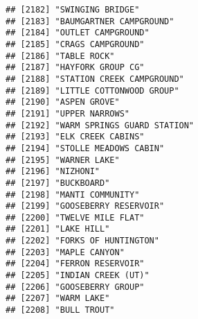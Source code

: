 \documentclass[
]{article}
\begin{document}
\begin{verbatim}
## [2182] "SWINGING BRIDGE"                                                                     
## [2183] "BAUMGARTNER CAMPGROUND"                                                              
## [2184] "OUTLET CAMPGROUND"                                                                   
## [2185] "CRAGS CAMPGROUND"                                                                    
## [2186] "TABLE ROCK"                                                                          
## [2187] "HAYFORK GROUP CG"                                                                    
## [2188] "STATION CREEK CAMPGROUND"                                                            
## [2189] "LITTLE COTTONWOOD GROUP"                                                             
## [2190] "ASPEN GROVE"                                                                         
## [2191] "UPPER NARROWS"                                                                       
## [2192] "WARM SPRINGS GUARD STATION"                                                          
## [2193] "ELK CREEK CABINS"                                                                    
## [2194] "STOLLE MEADOWS CABIN"                                                                
## [2195] "WARNER LAKE"                                                                         
## [2196] "NIZHONI"                                                                             
## [2197] "BUCKBOARD"                                                                           
## [2198] "MANTI COMMUNITY"                                                                     
## [2199] "GOOSEBERRY RESERVOIR"                                                                
## [2200] "TWELVE MILE FLAT"                                                                    
## [2201] "LAKE HILL"                                                                           
## [2202] "FORKS OF HUNTINGTON"                                                                 
## [2203] "MAPLE CANYON"                                                                        
## [2204] "FERRON RESERVOIR"                                                                    
## [2205] "INDIAN CREEK (UT)"                                                                   
## [2206] "GOOSEBERRY GROUP"                                                                    
## [2207] "WARM LAKE"                                                                           
## [2208] "BULL TROUT"                                                                          

\end{verbatim}
\end{document}
